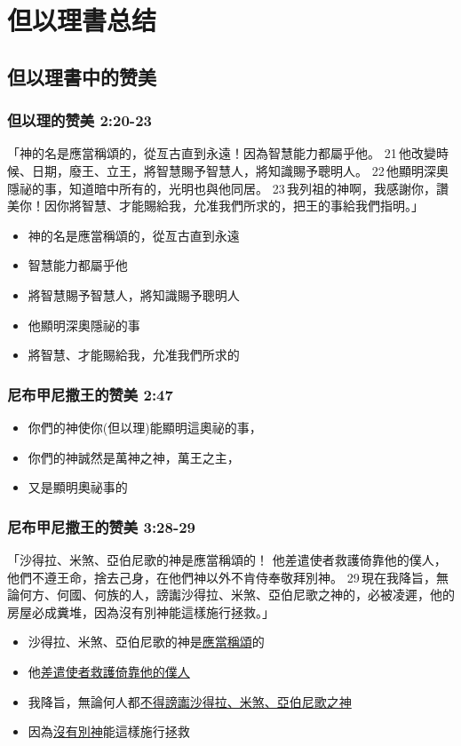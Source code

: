 

\section{但以理書总结}
\subsection{但以理書中的赞美}
\subsubsection{但以理的赞美 2:20-23}
「神的名是應當稱頌的，從亙古直到永遠！因為智慧能力都屬乎他。 
21 他改變時候、日期，廢王、立王，將智慧賜予智慧人，將知識賜予聰明人。 
22 他顯明深奧隱祕的事，知道暗中所有的，光明也與他同居。 
23 我列祖的神啊，我感謝你，讚美你！因你將智慧、才能賜給我，允准我們所求的，把王的事給我們指明。」
\begin{itemize}
\itemsep-.45em  
\item 神的名是應當稱頌的，從亙古直到永遠
\item 智慧能力都屬乎他
\item 將智慧賜予智慧人，將知識賜予聰明人
\item 他顯明深奧隱祕的事
\item 將智慧、才能賜給我，允准我們所求的
\end{itemize}

\subsubsection{尼布甲尼撒王的赞美 2:47}
\begin{itemize}
\itemsep-.45em  
\item 你們的神使你(但以理)能顯明這奧祕的事，
\item 你們的神誠然是萬神之神，萬王之主，
\item 又是顯明奧祕事的
\end{itemize}

\subsubsection{尼布甲尼撒王的赞美 3:28-29}
「沙得拉、米煞、亞伯尼歌的神是應當稱頌的！
他差遣使者救護倚靠他的僕人，他們不遵王命，捨去己身，在他們神以外不肯侍奉敬拜別神。 
29 現在我降旨，無論何方、何國、何族的人，謗讟沙得拉、米煞、亞伯尼歌之神的，必被凌遲，他的房屋必成糞堆，因為沒有別神能這樣施行拯救。」
\begin{itemize}
\itemsep-.45em  
\item 沙得拉、米煞、亞伯尼歌的神是\underline{應當稱頌}的
\item 他\underline{差遣使者救護倚靠他的僕人}
\item 我降旨，無論何人都\underline{不得謗讟沙得拉、米煞、亞伯尼歌之神}
\item 因為\underline{沒有別神}能這樣施行拯救
\end{itemize}


